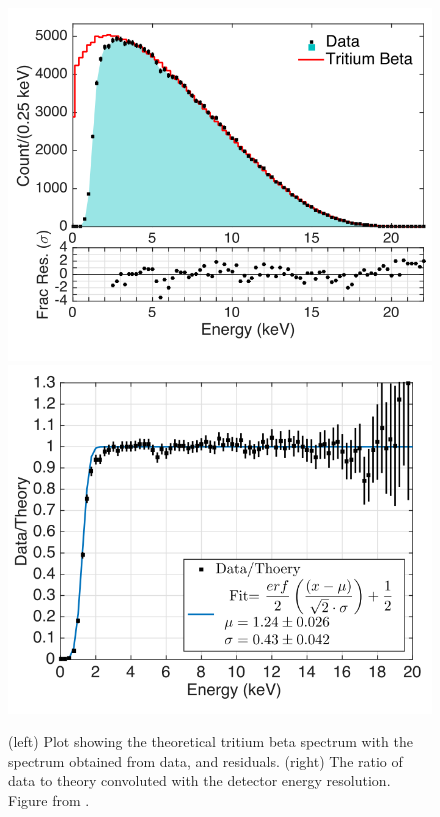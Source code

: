 \begin{figure}[htbp]
\begin{center}
\includegraphics[width=\halffig]{figures/lux/lux_tritium1a.png}
\includegraphics[width=\halffig]{figures/lux/lux_tritium1b.png}
\caption{ (left) Plot showing the theoretical tritium beta spectrum with the spectrum obtained from data, and residuals. (right) The ratio of data to theory convoluted with the detector energy resolution. Figure from \cite{LUXTritium}.}
\label{fig:tritium1}
\end{center}
\end{figure}

